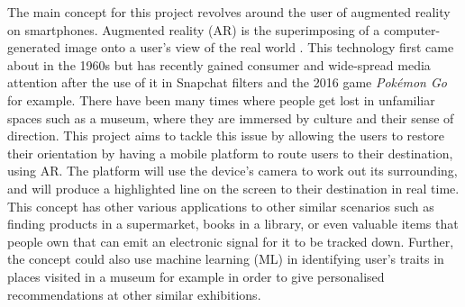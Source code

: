 
The main concept for this project revolves around the user of augmented reality on smartphones. Augmented reality (AR) is the superimposing of a computer-generated image onto a user's view of the real world \cite{oxforddict}. This technology first came about in the 1960s but has recently gained consumer and wide-spread media attention after the use of it in Snapchat filters and the 2016 game \textit{Pokémon Go} for example. There have been many times where people get lost in unfamiliar spaces such as a museum, where they are immersed by culture and their sense of direction. This project aims to tackle this issue by allowing the users to restore their orientation by having a mobile platform to route users to their destination, using AR. The platform will use the device's camera to work out its surrounding, and will produce a highlighted line on the screen to their destination in real time.\\ 

This concept has other various applications to other similar scenarios such as finding products in a supermarket, books in a library, or even valuable items that people own that can emit an electronic signal for it to be tracked down. Further, the concept could also use machine learning (ML) in identifying user's traits in places visited in a museum for example in order to give personalised recommendations at other similar exhibitions.